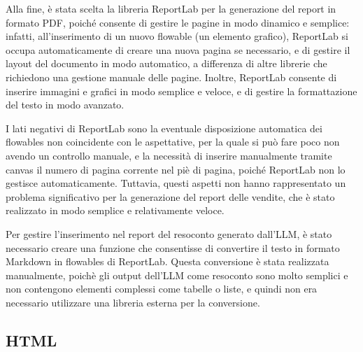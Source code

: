 Alla fine, è stata scelta la libreria ReportLab per la generazione del report in formato PDF, poiché consente di gestire le pagine in modo dinamico e semplice: infatti, all'inserimento di un nuovo flowable (un elemento grafico), ReportLab si occupa automaticamente di creare una nuova pagina se necessario, e di gestire il layout del documento in modo automatico, a differenza di altre librerie che richiedono una gestione manuale delle pagine. Inoltre, ReportLab consente di inserire immagini e grafici in modo semplice e veloce, e di gestire la formattazione del testo in modo avanzato.

I lati negativi di ReportLab sono la eventuale disposizione automatica dei flowables non coincidente con le aspettative, per la quale si può fare poco non avendo un controllo manuale, e la necessità di inserire manualmente tramite \gls{canvas} il numero di pagina corrente nel piè di pagina, poiché ReportLab non lo gestisce automaticamente. Tuttavia, questi aspetti non hanno rappresentato un problema significativo per la generazione del report delle vendite, che è stato realizzato in modo semplice e relativamente veloce.

Per gestire l'inserimento nel report del resoconto generato dall'LLM, è stato necessario creare una funzione che consentisse di convertire il testo in formato Markdown in flowables di ReportLab. Questa conversione è stata realizzata manualmente, poichè gli output dell'LLM come resoconto sono molto semplici e non contengono elementi complessi come tabelle o liste, e quindi non era necessario utilizzare una libreria esterna per la conversione.


\subsection{HTML}

